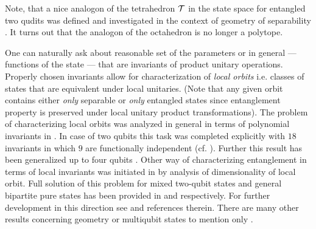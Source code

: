 \documentclass[twocolumn,aps,rmp]{revtex4}
\begin{document}
Note, that a nice analogon of the tetrahedron ${\cal T}$ in the state space
for entangled two qudits was defined and investigated in the context
of geometry of separability \cite{BaumgartnerHN2007}.
It turns out that the analogon of the octahedron is no longer a polytope.

One can naturally ask about reasonable set of the
parameters or in general --- functions of the state --- that are
invariants of product unitary operations. Properly chosen invariants
allow for characterization of {\it local orbits} i.e. classes of
states that are equivalent under local unitaries.  (Note that any
given orbit contains either {\it only} separable or {\it only}
entangled states since entanglement property is preserved under local
unitary product transformations). The problem of characterizing local
orbits was analyzed in general in terms of polynomial invariants in
\cite{SchlienzMahler,Grassl}. In case of two qubits this task was
completed explicitly with $18$ invariants in which $9$ are
functionally independent \cite{MixedInvariantsI}
(cf. \cite{Grassl}). Further this result has been generalized up to
four qubits \cite{MixedInvariantsII,MixedInvariantsIII}. Other way of
characterizing entanglement in terms of local invariants was initiated
in \cite{LindenOrbitsI,LindenOrbitsII} by analysis of dimensionality
of local orbit. Full solution of this problem for mixed two-qubit
states and general bipartite pure states has been provided in
\cite{2qOrbitsKus} and \cite{SinoleckaZK2001-manifold}
respectively. For further development in this direction see
\cite{KusGeometry} and references therein. There are many other
results concerning geometry or multiqubit states
to mention only \cite{Heydari,Levay2006-4qubits,Miyake2002-hyper}.
\end{document}
